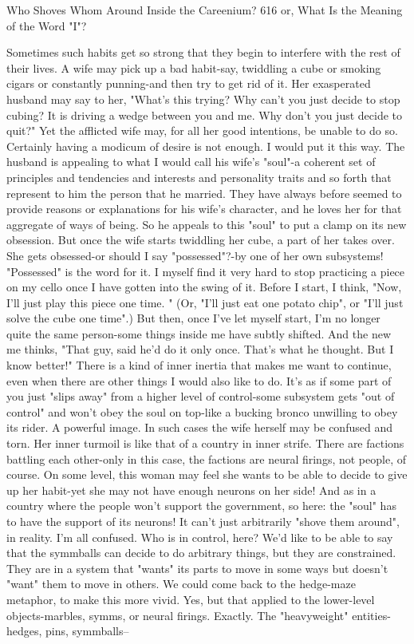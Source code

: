 Who Shoves Whom Around Inside the Careenium?                                         616
or, What Is the Meaning of the Word "I"?

  Sometimes such habits get so strong that they begin to interfere with the rest of
  their lives. A wife may pick up a bad habit-say, twiddling a cube or smoking cigars
  or constantly punning-and then try to get rid of it. Her exasperated husband may
  say to her, "What's this trying? Why can't you just decide to stop cubing? It is
  driving a wedge between you and me. Why don't you just decide to quit?" Yet the
  afflicted wife may, for all her good intentions, be unable to do so. Certainly having
  a modicum of desire is not enough. I would put it this way. The husband is
  appealing to what I would call his wife's "soul"-a coherent set of principles and
  tendencies and interests and personality traits and so forth that represent to him the
  person that he married. They have always before seemed to provide reasons or
  explanations for his wife's character, and he loves her for that aggregate of ways of
  being. So he appeals to this "soul" to put a clamp on its new obsession. But once
  the wife starts twiddling her cube, a part of her takes over. She gets obsessed-or
  should I say "possessed"?-by one of her own subsystems!
\achilles "Possessed" is the word for it. I myself find it very hard to stop
  practicing a piece on my cello once I have gotten into the swing of it. Before I
  start, I think, "Now, I'll just play this piece one time. " (Or, "I'll just eat one potato
  chip", or "I'll just solve the cube one time".) But then, once I've let myself start, I'm
  no longer quite the same person-some things inside me have subtly shifted. And
  the new me thinks, "That guy, said he'd do it only once. That's what he thought.
  But I know better!" There is a kind of inner inertia that makes me want to continue,
  even when there are other things I would also like to do. It's as if some part of you
  just "slips away" from a higher level of control-some subsystem gets "out of
  control" and won't obey the soul on top-like a bucking bronco unwilling to obey its
  rider.
\tortoise A powerful image. In such cases the wife herself may be confused and
  torn. Her inner turmoil is like that of a country in inner strife. There are factions
  battling each other-only in this case, the factions are neural firings, not people, of
  course. On some level, this woman may feel she wants to be able to decide to give
  up her habit-yet she may not have enough neurons on her side! And as in a country
  where the people won't support the government, so here: the "soul" has to have the
  support of its neurons! It can't just arbitrarily "shove them around", in reality.
\achilles I'm all confused. Who is in control, here?
\tortoise We'd like to be able to say that the symmballs can decide to do arbitrary
  things, but they are constrained. They are in a system that "wants" its parts to move
  in some ways but doesn't "want" them to move in others. We could come back to
  the hedge-maze metaphor, to make this more vivid.
\achilles Yes, but that applied to the lower-level objects-marbles, symms, or
  neural firings.
\tortoise Exactly. The "heavyweight" entities-hedges, pins, symmballs--




